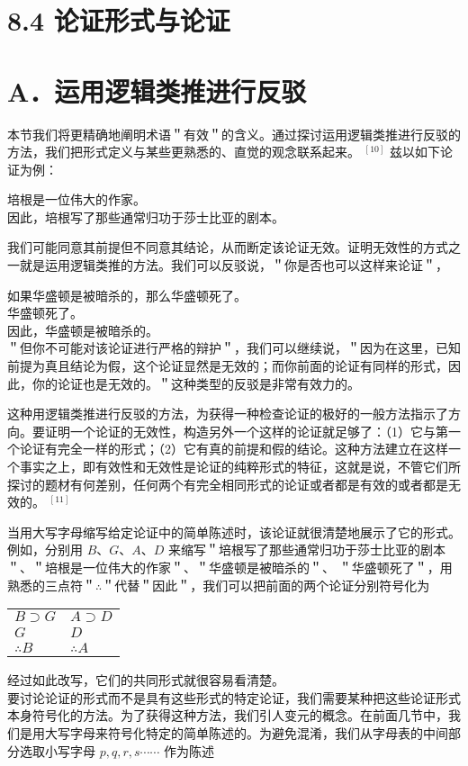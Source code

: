 \section*{8.4 论证形式与论证}
\section*{A．运用逻辑类推进行反驳}
本节我们将更精确地阐明术语＂有效＂的含义。通过探讨运用逻辑类推进行反驳的方法，我们把形式定义与某些更熟悉的、直觉的观念联系起来。 ${ }^{[10]}$ 兹以如下论证为例：

培根是一位伟大的作家。\\
因此，培根写了那些通常归功于莎士比亚的剧本。

我们可能同意其前提但不同意其结论，从而断定该论证无效。证明无效性的方式之一就是运用逻辑类推的方法。我们可以反驳说，＂你是否也可以这样来论证＂，

如果华盛顿是被暗杀的，那么华盛顿死了。\\
华盛顿死了。\\
因此，华盛顿是被暗杀的。\\
＂但你不可能对该论证进行严格的辩护＂，我们可以继续说，＂因为在这里，已知前提为真且结论为假，这个论证显然是无效的；而你前面的论证有同样的形式，因此，你的论证也是无效的。＂这种类型的反驳是非常有效力的。

这种用逻辑类推进行反驳的方法，为获得一种检查论证的极好的一般方法指示了方向。要证明一个论证的无效性，构造另外一个这样的论证就足够了：（1）它与第一个论证有完全一样的形式；（2）它有真的前提和假的结论。这种方法建立在这样一个事实之上，即有效性和无效性是论证的纯粹形式的特征，这就是说，不管它们所探讨的题材有何差别，任何两个有完全相同形式的论证或者都是有效的或者都是无效的。 ${ }^{[11]}$

当用大写字母缩写给定论证中的简单陈述时，该论证就很清楚地展示了它的形式。例如，分别用 $B 、 G 、 A 、 D$ 来缩写＂培根写了那些通常归功于莎士比亚的剧本＂、＂培根是一位伟大的作家＂、＂华盛顿是被暗杀的＂、 ＂华盛顿死了＂，用熟悉的三点符＂$\therefore$＂代替＂因此＂，我们可以把前面的两个论证分别符号化为

\begin{center}
\begin{tabular}{ll}
$B \supset G$ & $A \supset D$ \\
$G$ & $D$ \\
$\therefore B$ & $\therefore A$ \\
\end{tabular}
\end{center}

经过如此改写，它们的共同形式就很容易看清楚。\\
要讨论论证的形式而不是具有这些形式的特定论证，我们需要某种把这些论证形式本身符号化的方法。为了获得这种方法，我们引人变元的概念。在前面几节中，我们是用大写字母来符号化特定的简单陈述的。为避免混淆，我们从字母表的中间部分选取小写字母 $p, q, r, s \cdots \cdots$ 作为陈述

